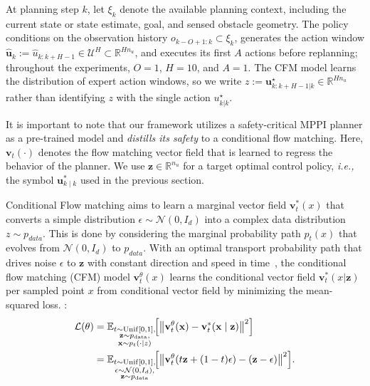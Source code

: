 \documentclass[letterpaper, 10 pt, conference]{ieeeconf}
\begin{document}
At planning step $k$, let $\xi_k$ denote the available planning context, including the current state or state estimate, goal, and sensed obstacle geometry. The policy conditions on the observation history $o_{k-O+1:k}\subset\xi_k$, generates the action window $\hat{\mathbf u}_k:=\hat u_{k:k+H-1}\in\mathcal U^H\subset\mathbb R^{Hn_u}$, and executes its first $A$ actions before replanning; throughout the experiments, $O=1$, $H=10$, and $A=1$. The CFM model learns the distribution of expert action windows, so we write $z:=\mathbf u^\star_{k:k+H-1|k}\in\mathbb R^{Hn_u}$ rather than identifying $z$ with the single action $u^\star_{k|k}$.

It is important to note that our framework utilizes a safety-critical MPPI planner as a pre-trained model and \textit{distills its safety} to a conditional flow matching. Here, $\mathbf{v}_t(\cdot)$ denotes the flow matching vector field that is learned to regress the behavior of the planner. We use \(\mathbf{z}\in\mathbb{R}^{n_u}\) for a target optimal control policy, \textit{i.e.,} the symbol \(\mathbf{u}^*_{k\mid k}\) used in the previous section.

Conditional Flow matching aims to learn a marginal vector field $\mathbf{v}^*_t(x)$ that converts a simple distribution $\epsilon \sim \mathcal{N}(0, I_d)$ into a complex data distribution $z \sim p_{data}$. This is done by considering the marginal probability path $p_t(x)$ that evolves from $\mathcal{N}(0, I_d)$ to $p_{data}$. With an optimal transport probability path that drives noise $\epsilon$ to $\mathbf{z}$ with constant direction and speed in time~\cite{lipman2022flow}, the conditional flow matching (CFM) model $\mathbf{v}_t^\theta(x)$ learns the conditional vector field $\mathbf{v}^*_t(x|\mathbf{z})$ per sampled point $x$ from conditional vector field by minimizing the mean-squared loss. :
\begin{align}
\mathcal{L}(\theta)&=
\mathbb{E}_{\substack{
t\sim \mathrm{Unif}[0,1],\\
\mathbf{z}\sim p_{\mathrm{data}},\\ \mathbf{x}\sim p_t(\cdot\mid z)
}} \notag
\!\Bigl[\bigl\|\mathbf{v}_t^\theta(\mathbf{x})-\mathbf{v}_t^*(\mathbf{x}\mid \mathbf{z})\bigr\|^2\Bigr]
\label{eq:cfm}\\
&=\mathbb{E}_{\substack{
t\sim \mathrm{Unif}[0,1],\\ \epsilon\sim\mathcal{N}(0,I_d),\\
\mathbf{z}\sim p_{\mathrm{data}}
}}
\!\Bigl[\bigl\|\mathbf{v}_t^\theta(t\mathbf{z}+(1-t)\epsilon)-(\mathbf{z}-\epsilon)\bigr\|^2\Bigr].
\end{align}
\end{document}
